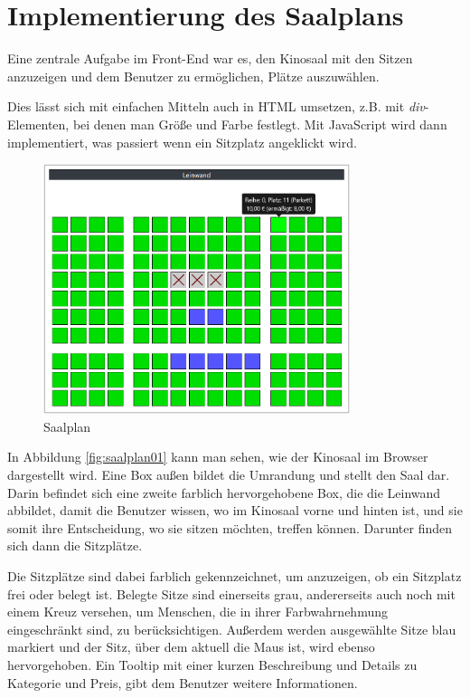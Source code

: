 \section{Implementierung des Saalplans}
\authorsection{\authorNL}

Eine zentrale Aufgabe im Front-End war es, den Kinosaal mit den Sitzen anzuzeigen und dem Benutzer zu ermöglichen, Plätze auszuwählen.

Dies lässt sich mit einfachen Mitteln auch in \acs{HTML} umsetzen, z.B. mit \textit{div}-Elementen, bei denen man Größe und Farbe festlegt.
Mit JavaScript wird dann implementiert, was passiert wenn ein Sitzplatz angeklickt wird.

\begin{figure}[ht]
	\centering
	\includegraphics[width=0.8\textwidth]{img/screenshots/saalplan01}
	\captionsetup{format=hang}
	\caption{Saalplan}
	\label{fig:saalplan01}
\end{figure}

In Abbildung \vref{fig:saalplan01} kann man sehen, wie der Kinosaal im Browser dargestellt wird.
Eine Box außen bildet die Umrandung und stellt den Saal dar.
Darin befindet sich eine zweite farblich hervorgehobene Box, die die Leinwand abbildet, damit die Benutzer wissen, wo im Kinosaal vorne und hinten ist, und sie somit ihre Entscheidung, wo sie sitzen möchten, treffen können.
Darunter finden sich dann die Sitzplätze.

Die Sitzplätze sind dabei farblich gekennzeichnet, um anzuzeigen, ob ein Sitzplatz frei oder belegt ist.
Belegte Sitze sind einerseits grau, andererseits auch noch mit einem Kreuz versehen, um Menschen, die in ihrer Farbwahrnehmung eingeschränkt sind, zu berücksichtigen.
Außerdem werden ausgewählte Sitze blau markiert und der Sitz, über dem aktuell die Maus ist, wird ebenso hervorgehoben.
Ein Tooltip mit einer kurzen Beschreibung und Details zu Kategorie und Preis, gibt dem Benutzer weitere Informationen.

